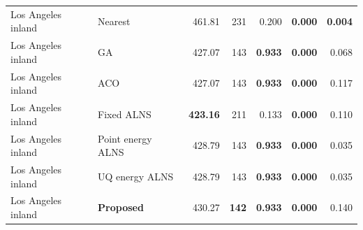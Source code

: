 \begin{table}[H]
\begin{tabular}{@{}llrrrrr@{}}
Los Angeles inland & Nearest & 461.81 & 231 & 0.200 & \textbf{0.000} & \textbf{0.004} \\

Los Angeles inland & GA & 427.07 & 143 & \textbf{0.933} & \textbf{0.000} & 0.068 \\

Los Angeles inland & ACO & 427.07 & 143 & \textbf{0.933} & \textbf{0.000} & 0.117 \\

Los Angeles inland & Fixed ALNS & \textbf{423.16} & 211 & 0.133 & \textbf{0.000} & 0.110 \\

Los Angeles inland & Point energy ALNS & 428.79 & 143 & \textbf{0.933} & \textbf{0.000} & 0.035 \\

Los Angeles inland & UQ energy ALNS & 428.79 & 143 & \textbf{0.933} & \textbf{0.000} & 0.035 \\
\rowcolor{gray!10}
Los Angeles inland & \textbf{Proposed} & 430.27 & \textbf{142} & \textbf{0.933} & \textbf{0.000} & 0.140 \\
\bottomrule
\end{tabular}
\end{table}

